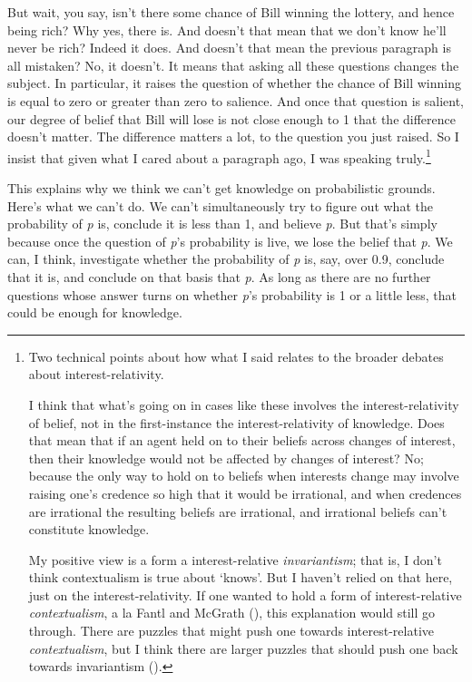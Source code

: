 \documentclass[
  10pt,
  letterpaper,
  DIV=11,
  numbers=noendperiod,
  twoside]{scrartcl}
\begin{document}
But wait, you say, isn't there some chance of Bill winning the lottery,
and hence being rich? Why yes, there is. And doesn't that mean that we
don't know he'll never be rich? Indeed it does. And doesn't that mean
the previous paragraph is all mistaken? No, it doesn't. It means that
asking all these questions changes the subject. In particular, it raises
the question of whether the chance of Bill winning is equal to zero or
greater than zero to salience. And once that question is salient, our
degree of belief that Bill will lose is not close enough to 1 that the
difference doesn't matter. The difference matters a lot, to the question
you just raised. So I insist that given what I cared about a paragraph
ago, I was speaking truly.\footnote{Two technical points about how what
  I said relates to the broader debates about interest-relativity.

  I think that what's going on in cases like these involves the
  interest-relativity of belief, not in the first-instance the
  interest-relativity of knowledge. Does that mean that if an agent held
  on to their beliefs across changes of interest, then their knowledge
  would not be affected by changes of interest? No; because the only way
  to hold on to beliefs when interests change may involve raising one's
  credence so high that it would be irrational, and when credences are
  irrational the resulting beliefs are irrational, and irrational
  beliefs can't constitute knowledge.

  My positive view is a form a interest-relative \emph{invariantism};
  that is, I don't think contextualism is true about `knows'. But I
  haven't relied on that here, just on the interest-relativity. If one
  wanted to hold a form of interest-relative \emph{contextualism}, a la
  Fantl and McGrath (), this
  explanation would still go through. There are puzzles that might push
  one towards interest-relative \emph{contextualism}, but I think there
  are larger puzzles that should push one back towards invariantism
  ().}

This explains why we think we can't get knowledge on probabilistic
grounds. Here's what we can't do. We can't simultaneously try to figure
out what the probability of \emph{p} is, conclude it is less than 1, and
believe \emph{p}. But that's simply because once the question of
\emph{p}'s probability is live, we lose the belief that \emph{p}. We
can, I think, investigate whether the probability of \emph{p} is, say,
over 0.9, conclude that it is, and conclude on that basis that \emph{p}.
As long as there are no further questions whose answer turns on whether
\emph{p}'s probability is 1 or a little less, that could be enough for
knowledge.
\end{document}
